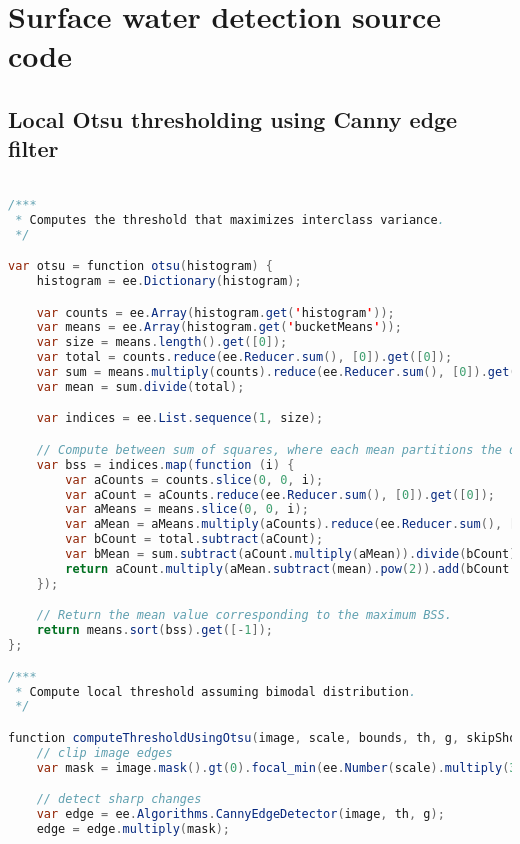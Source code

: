 \chapter{Surface water detection source code}

\newpage

\section{Local Otsu thresholding using Canny edge filter}


\begin{lstlisting}[language=Java, basicstyle=\tiny]

/***
 * Computes the threshold that maximizes interclass variance.
 */

var otsu = function otsu(histogram) {
    histogram = ee.Dictionary(histogram);

    var counts = ee.Array(histogram.get('histogram'));
    var means = ee.Array(histogram.get('bucketMeans'));
    var size = means.length().get([0]);
    var total = counts.reduce(ee.Reducer.sum(), [0]).get([0]);
    var sum = means.multiply(counts).reduce(ee.Reducer.sum(), [0]).get([0]);
    var mean = sum.divide(total);

    var indices = ee.List.sequence(1, size);

    // Compute between sum of squares, where each mean partitions the data.
    var bss = indices.map(function (i) {
        var aCounts = counts.slice(0, 0, i);
        var aCount = aCounts.reduce(ee.Reducer.sum(), [0]).get([0]);
        var aMeans = means.slice(0, 0, i);
        var aMean = aMeans.multiply(aCounts).reduce(ee.Reducer.sum(), [0]).get([0]).divide(aCount);
        var bCount = total.subtract(aCount);
        var bMean = sum.subtract(aCount.multiply(aMean)).divide(bCount);
        return aCount.multiply(aMean.subtract(mean).pow(2)).add(bCount.multiply(bMean.subtract(mean).pow(2)));
    });

    // Return the mean value corresponding to the maximum BSS.
    return means.sort(bss).get([-1]);
};

/***
 * Compute local threshold assuming bimodal distribution.
 */

function computeThresholdUsingOtsu(image, scale, bounds, th, g, skipShort, weightGradient, minValue) {
    // clip image edges
    var mask = image.mask().gt(0).focal_min(ee.Number(scale).multiply(3), 'circle', 'meters');

    // detect sharp changes
    var edge = ee.Algorithms.CannyEdgeDetector(image, th, g);
    edge = edge.multiply(mask);
    

\end{lstlisting}
